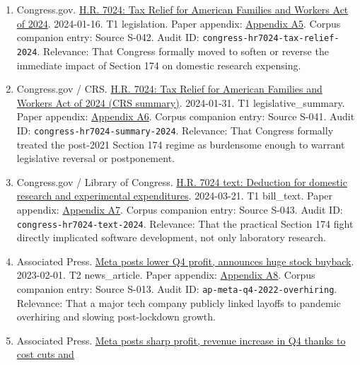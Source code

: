 \documentclass[
  american,
  11pt,
  letterpaper,
]{article}
\begin{document}
\begin{enumerate}
  sector.
\item
  Congress.gov.
  \href{https://www.congress.gov/bill/118th-congress/house-bill/7024}{H.R.
  7024: Tax Relief for American Families and Workers Act of 2024}.
  2024-01-16. T1 legislation. Paper appendix:
  \hyperref[appendix-a5-h-r-7024-tax-relief-for-american-families-and-workers-act-of-2024]{Appendix
  A5}. Corpus companion entry: Source S-042. Audit ID:
  \texttt{congress-hr7024-tax-relief-2024}. Relevance: That Congress
  formally moved to soften or reverse the immediate impact of Section
  174 on domestic research expensing.
\item
  Congress.gov / CRS.
  \href{https://www.congress.gov/bill/118th-congress/house-bill/7024}{H.R.
  7024: Tax Relief for American Families and Workers Act of 2024 (CRS
  summary)}. 2024-01-31. T1 legislative\_summary. Paper appendix:
  \hyperref[appendix-a6-h-r-7024-tax-relief-for-american-families-and-workers-act-of-2024-crs-summary]{Appendix
  A6}. Corpus companion entry: Source S-041. Audit ID:
  \texttt{congress-hr7024-summary-2024}. Relevance: That Congress
  formally treated the post-2021 Section 174 regime as burdensome enough
  to warrant legislative reversal or postponement.
\item
  Congress.gov / Library of Congress.
  \href{https://www.congress.gov/bill/118th-congress/house-bill/7024/text}{H.R.
  7024 text: Deduction for domestic research and experimental
  expenditures}. 2024-03-21. T1 bill\_text. Paper appendix:
  \hyperref[appendix-a7-h-r-7024-text-deduction-for-domestic-research-and-experimental-expenditures]{Appendix
  A7}. Corpus companion entry: Source S-043. Audit ID:
  \texttt{congress-hr7024-text-2024}. Relevance: That the practical
  Section 174 fight directly implicated software development, not only
  laboratory research.
\item
  Associated Press.
  \href{https://apnews.com/article/b884c9ac96be1c22f81d7243176a321d}{Meta
  posts lower Q4 profit, announces huge stock buyback}. 2023-02-01. T2
  news\_article. Paper appendix:
  \hyperref[appendix-a8-meta-posts-lower-q4-profit-announces-huge-stock-buyback]{Appendix
  A8}. Corpus companion entry: Source S-013. Audit ID:
  \texttt{ap-meta-q4-2022-overhiring}. Relevance: That a major tech
  company publicly linked layoffs to pandemic overhiring and slowing
  post-lockdown growth.
\item
  Associated Press.
  \href{https://apnews.com/article/abc3e389d97fb97c661ccb6acfcf65c7}{Meta
  posts sharp profit, revenue increase in Q4 thanks to cost cuts and
}
\end{enumerate}
\end{document}
